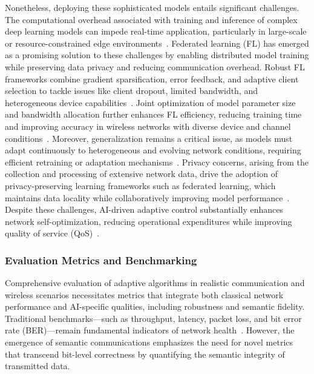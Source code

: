 \documentclass[sigconf]{acmart}
\begin{document}
Nonetheless, deploying these sophisticated models entails significant challenges. The computational overhead associated with training and inference of complex deep learning models can impede real-time application, particularly in large-scale or resource-constrained edge environments~\cite{ref4,ref5}. Federated learning (FL) has emerged as a promising solution to these challenges by enabling distributed model training while preserving data privacy and reducing communication overhead. Robust FL frameworks combine gradient sparsification, error feedback, and adaptive client selection to tackle issues like client dropout, limited bandwidth, and heterogeneous device capabilities~\cite{ref4}. Joint optimization of model parameter size and bandwidth allocation further enhances FL efficiency, reducing training time and improving accuracy in wireless networks with diverse device and channel conditions~\cite{ref5}. Moreover, generalization remains a critical issue, as models must adapt continuously to heterogeneous and evolving network conditions, requiring efficient retraining or adaptation mechanisms~\cite{ref7}. Privacy concerns, arising from the collection and processing of extensive network data, drive the adoption of privacy-preserving learning frameworks such as federated learning, which maintains data locality while collaboratively improving model performance~\cite{ref10,ref11}. Despite these challenges, AI-driven adaptive control substantially enhances network self-optimization, reducing operational expenditures while improving quality of service (QoS)~\cite{ref14,ref50}.

\subsubsection{Evaluation Metrics and Benchmarking}

Comprehensive evaluation of adaptive algorithms in realistic communication and wireless scenarios necessitates metrics that integrate both classical network performance and AI-specific qualities, including robustness and semantic fidelity. Traditional benchmarks---such as throughput, latency, packet loss, and bit error rate (BER)---remain fundamental indicators of network health~\cite{ref3,ref5}. However, the emergence of semantic communications emphasizes the need for novel metrics that transcend bit-level correctness by quantifying the semantic integrity of transmitted data.
\end{document}
